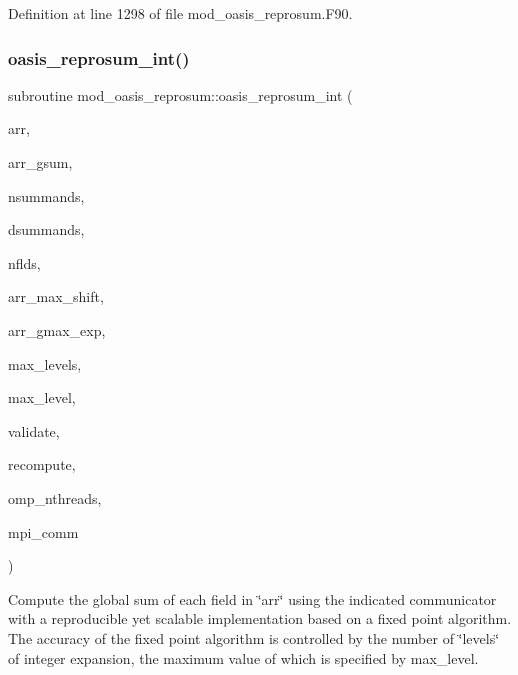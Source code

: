 Definition at line 1298 of file mod\+\_\+oasis\+\_\+reprosum.\+F90.

\mbox{\label{namespacemod__oasis__reprosum_a7ea3c5bad9db10c80eb528453602aed3}} 
\subsubsection{\texorpdfstring{oasis\+\_\+reprosum\+\_\+int()}{oasis\_reprosum\_int()}}
{\footnotesize\ttfamily subroutine mod\+\_\+oasis\+\_\+reprosum\+::oasis\+\_\+reprosum\+\_\+int (\begin{DoxyParamCaption}\item[{real(r8), dimension(dsummands,nflds), intent(in)}]{arr,  }\item[{real(r8), dimension(nflds), intent(out)}]{arr\+\_\+gsum,  }\item[{integer, intent(in)}]{nsummands,  }\item[{integer, intent(in)}]{dsummands,  }\item[{integer, intent(in)}]{nflds,  }\item[{integer, intent(in)}]{arr\+\_\+max\+\_\+shift,  }\item[{integer, dimension(nflds), intent(in)}]{arr\+\_\+gmax\+\_\+exp,  }\item[{integer, dimension(nflds), intent(in)}]{max\+\_\+levels,  }\item[{integer, intent(in)}]{max\+\_\+level,  }\item[{logical, intent(in)}]{validate,  }\item[{logical, intent(out)}]{recompute,  }\item[{integer, intent(in)}]{omp\+\_\+nthreads,  }\item[{integer, intent(in)}]{mpi\+\_\+comm }\end{DoxyParamCaption})\hspace{0.3cm}{\ttfamily [private]}}



Compute the global sum of each field in \char`\"{}arr\char`\"{} using the indicated communicator with a reproducible yet scalable implementation based on a fixed point algorithm. The accuracy of the fixed point algorithm is controlled by the number of \char`\"{}levels\char`\"{} of integer expansion, the maximum value of which is specified by max\+\_\+level. 


